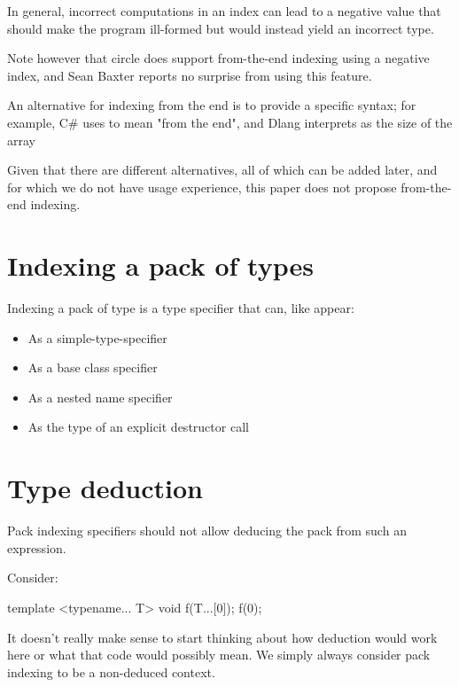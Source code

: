 \documentclass{wg21}
\begin{document}
In general, incorrect computations in an index can lead to a negative value that should make the program ill-formed but would instead
yield an incorrect type.

Note however that circle does support from-the-end indexing using a negative index, and Sean Baxter reports no surprise from using this feature.

An alternative for indexing from the end is to provide a specific syntax; for example, C\# uses \tcode{\^{}} to mean "from the end", and Dlang interprets \tcode{\${}}
as the size of the array

Given that there are different alternatives, all of which can be added later, and for which we do not have usage experience, this paper does not propose
from-the-end indexing.

\section{Indexing a pack of types}

Indexing a pack of type is a type specifier that can, like  appear:
\begin{itemize}
    \item As a simple-type-specifier
    \item As a base class specifier
    \item As a nested name specifier
    \item As the type of an explicit destructor call
\end{itemize}

\section{Type deduction}

Pack indexing specifiers should not allow deducing the pack from such an expression.

Consider:

\begin{colorblock}
template <typename... T>
void f(T...[0]);
f(0);
\end{colorblock}

It doesn't really make sense to start thinking about how deduction would work here or what that code would possibly mean.
We simply always consider pack indexing to be a non-deduced context.
\end{document}
